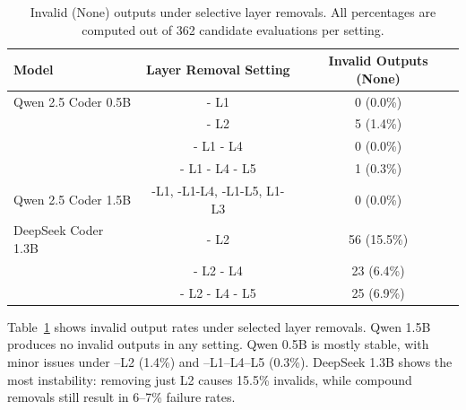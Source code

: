 \documentclass[a4paper]{usiinfbachelorproject}
\begin{document}
\begin{table}[H]
\centering
\small
\begin{tabular}{lcc}
\toprule
\textbf{Model} & \textbf{Layer Removal Setting} & \textbf{Invalid Outputs (None)} \\
\midrule
Qwen 2.5 Coder 0.5B & - L1 & 0 (0.0\%) \\
                    & - L2 & 5 (1.4\%) \\
                    & - L1 - L4 & 0 (0.0\%) \\
                    & - L1 - L4 - L5 & 1 (0.3\%) \\
Qwen 2.5 Coder 1.5B & -L1, -L1-L4, -L1-L5, L1-L3 & 0 (0.0\%) \\
DeepSeek Coder 1.3B & - L2 & 56 (15.5\%) \\
              & - L2 - L4 & 23 (6.4\%) \\
              & - L2 - L4 - L5 & 25 (6.9\%) \\
\bottomrule
\end{tabular}
\caption{Invalid (None) outputs under selective layer removals. All percentages are computed out of 362 candidate evaluations per setting.}
\label{tab:ablation-invalids}
\end{table}
\noindent
Table~\ref{tab:ablation-invalids} shows invalid output rates under selected layer removals. Qwen 1.5B produces no invalid outputs in any setting. Qwen 0.5B is mostly stable, with minor issues under –L2 (1.4\%) and –L1–L4–L5 (0.3\%). DeepSeek 1.3B shows the most instability: removing just L2 causes 15.5\% invalids, while compound removals still result in 6–7\% failure rates.
\end{document}

